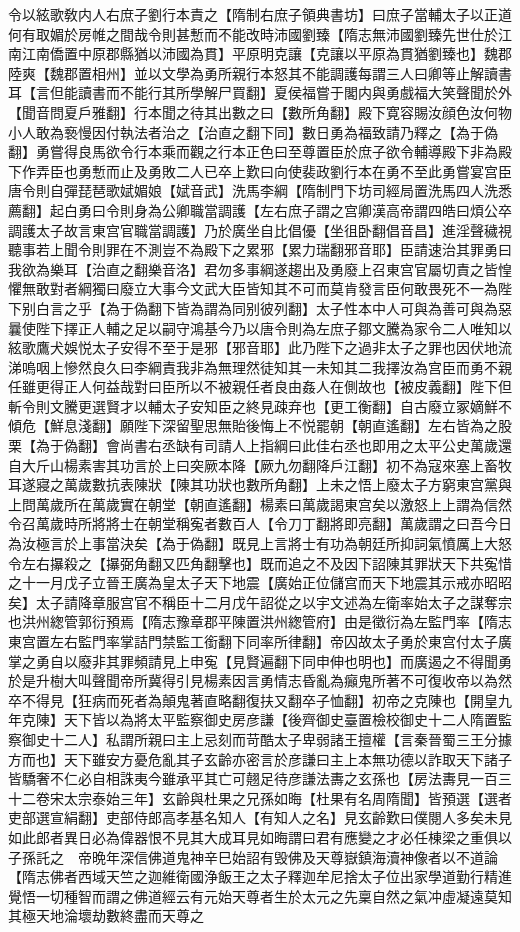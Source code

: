 令以絃歌敎内人右庶子劉行本責之【隋制右庶子領典書坊】曰庶子當輔太子以正道何有取媚於房帷之間哉令則甚慙而不能改時沛國劉臻【隋志無沛國劉臻先世仕於江南江南僑置中原郡縣猶以沛國為貫】平原明克讓【克讓以平原為貫猶劉臻也】魏郡陸爽【魏郡置相州】並以文學為勇所親行本怒其不能調護每謂三人曰卿等止解讀書耳【言但能讀書而不能行其所學解尸買翻】夏侯福嘗于閣内與勇戲福大笑聲聞於外【聞音問夏戶雅翻】行本聞之待其出數之曰【數所角翻】殿下寛容賜汝顔色汝何物小人敢為䙝慢因付執法者治之【治直之翻下同】數日勇為福致請乃釋之【為于偽翻】勇嘗得良馬欲令行本乘而觀之行本正色曰至尊置臣於庶子欲令輔導殿下非為殿下作弄臣也勇慙而止及勇敗二人已卒上歎曰向使裴政劉行本在勇不至此勇嘗宴宫臣唐令則自彈琵琶歌娬媚娘【娬音武】洗馬李綱【隋制門下坊司經局置洗馬四人洗悉薦翻】起白勇曰令則身為公卿職當調護【左右庶子謂之宫卿漢高帝謂四皓曰煩公卒調護太子故言東宫官職當調護】乃於廣坐自比倡優【坐徂卧翻倡音昌】進淫聲穢視聽事若上聞令則罪在不測豈不為殿下之累邪【累力瑞翻邪音耶】臣請速治其罪勇曰我欲為樂耳【治直之翻樂音洛】君勿多事綱遂趨出及勇廢上召東宫官屬切責之皆惶懼無敢對者綱獨曰廢立大事今文武大臣皆知其不可而莫肯發言臣何敢畏死不一為陛下别白言之乎【為于偽翻下皆為謂為同别彼列翻】太子性本中人可與為善可與為惡曩使陛下擇正人輔之足以嗣守鴻基今乃以唐令則為左庶子鄒文騰為家令二人唯知以絃歌鷹犬娛悦太子安得不至于是邪【邪音耶】此乃陛下之過非太子之罪也因伏地流涕嗚咽上慘然良久曰李綱責我非為無理然徒知其一未知其二我擇汝為宫臣而勇不親任雖更得正人何益哉對曰臣所以不被親任者良由姦人在側故也【被皮義翻】陛下但斬令則文騰更選賢才以輔太子安知臣之終見疎弃也【更工衡翻】自古廢立冢嫡鮮不傾危【鮮息淺翻】願陛下深留聖思無貽後悔上不悦罷朝【朝直遙翻】左右皆為之股栗【為于偽翻】會尚書右丞缺有司請人上指綱曰此佳右丞也即用之太平公史萬歲還自大斤山楊素害其功言於上曰突厥本降【厥九勿翻降戶江翻】初不為寇來塞上畜牧耳遂寢之萬歲數抗表陳狀【陳其功狀也數所角翻】上未之悟上廢太子方窮東宫黨與上問萬歲所在萬歲實在朝堂【朝直遙翻】楊素曰萬歲謁東宫矣以激怒上上謂為信然令召萬歲時所將將士在朝堂稱寃者數百人【令刀丁翻將即亮翻】萬歲謂之曰吾今日為汝極言於上事當決矣【為于偽翻】既見上言將士有功為朝廷所抑詞氣憤厲上大怒令左右㩧殺之【㩧弼角翻又匹角翻擊也】既而追之不及因下詔陳其罪狀天下共寃惜之十一月戊子立晉王廣為皇太子天下地震【廣始正位儲宫而天下地震其示戒亦昭昭矣】太子請降章服宫官不稱臣十二月戊午詔從之以宇文述為左衛率始太子之謀奪宗也洪州緫管郭衍預焉【隋志豫章郡平陳置洪州緫管府】由是徵衍為左監門率【隋志東宫置左右監門率掌詰門禁監工銜翻下同率所律翻】帝囚故太子勇於東宫付太子廣掌之勇自以廢非其罪頻請見上申寃【見賢遍翻下同申伸也明也】而廣遏之不得聞勇於是升樹大叫聲聞帝所冀得引見楊素因言勇情志昏亂為癲鬼所著不可復收帝以為然卒不得見【狂病而死者為顛鬼著直略翻復扶又翻卒子恤翻】初帝之克陳也【開皇九年克陳】天下皆以為將太平監察御史房彦謙【後齊御史臺置檢校御史十二人隋置監察御史十二人】私謂所親曰主上忌刻而苛酷太子卑弱諸王擅權【言秦晉蜀三王分據方而也】天下雖安方憂危亂其子玄齡亦密言於彦謙曰主上本無功德以詐取天下諸子皆驕奢不仁必自相誅夷今雖承平其亡可翹足待彦謙法夀之玄孫也【房法夀見一百三十二卷宋太宗泰始三年】玄齡與杜果之兄孫如晦【杜果有名周隋聞】皆預選【選者吏部選宣絹翻】吏部侍郎高孝基名知人【有知人之名】見玄齡歎曰僕閱人多矣未見如此郎者異日必為偉器恨不見其大成耳見如晦謂曰君有應變之才必任棟梁之重俱以子孫託之　帝晩年深信佛道鬼神辛巳始詔有毁佛及天尊嶽鎮海瀆神像者以不道論【隋志佛者西域天竺之迦維衛國浄飯王之太子釋迦牟尼捨太子位出家學道勤行精進覺悟一切種智而謂之佛道經云有元始天尊者生於太元之先稟自然之氣冲虛凝遠莫知其極天地淪壞劫數終盡而天尊之
